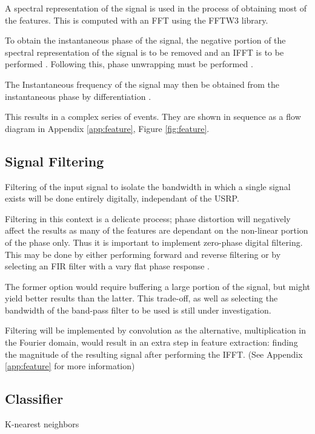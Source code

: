 \documentclass[10pt,onecolumn]{witseiepaper}
\begin{document}
\begin{multicols}{2}
		A spectral representation of the signal is used in the process of obtaining most of the features. This is computed with an FFT using the FFTW3 library. 
		
		To obtain the instantaneous phase of the signal, the negative portion of the spectral representation of the signal is to be removed and an IFFT is to be performed \cite{picinbono1997instantaneous}. Following this, phase unwrapping must be performed \cite{park2009introduction, picinbono1997instantaneous}.

		The Instantaneous frequency of the signal may then be obtained from the instantaneous phase by differentiation \cite{park2009introduction}.

		This results in a complex series of events. They are shown in sequence as a flow diagram in Appendix \ref{app:feature}, Figure \ref{fig:feature}.

	\subsection{Signal Filtering}
		Filtering of the input signal to isolate the bandwidth in which a single signal exists will be done entirely digitally, independant of the USRP.

		Filtering in this context is a delicate process; phase distortion will negatively affect the results as many of the features are dependant on the non-linear portion of the phase only. 
		Thus it is important to implement zero-phase digital filtering.
		This may be done by either performing forward and reverse filtering or by selecting an FIR filter with a vary flat phase response \cite{sundararajan2003digital}.

		The former option would require buffering a large portion of the signal, but might yield better results than the latter. This trade-off, as well as selecting the bandwidth of the band-pass filter to be used is still under investigation.

		Filtering will be implemented by convolution as the alternative, multiplication in the Fourier domain, would result in an extra step in feature extraction: finding the magnitude of the resulting signal after performing the IFFT. (See Appendix \ref{app:feature} for more information)

	\subsection{Classifier}
	K-nearest neighbors


\end{multicols}
\end{document}
